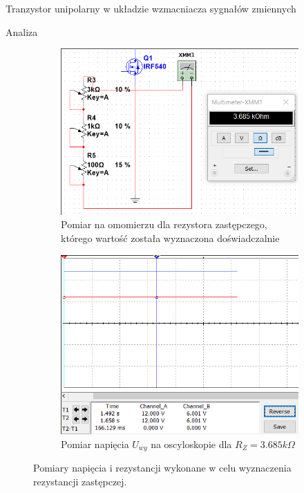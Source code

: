 \documentclass[a4paper]{scrartcl}
\begin{document}
\begin{section}{Tranzystor unipolarny w układzie wzmacniacza sygnałów zmiennych}
\begin{subsection}{Analiza}
\begin{figure}[!ht]
				\end{figure}
				\begin{figure}[!ht]
				\begin{center}
					\begin{subfigure}{.45\textwidth}
						\begin{center}
						\includegraphics[width=\linewidth,scale=2]{exercise-2-ohms}
						\caption{Pomiar na omomierzu dla rezystora zastępczego, którego wartość została wyznaczona doświadczalnie}
						\label{fig:exercise-2-punkt-pracy}
						\end{center}
					\end{subfigure}
					\begin{subfigure}{.45\textwidth}
						\begin{center}
						\includegraphics[width=\linewidth,scale=2]{exercise-2-punkt-pracy}
						\caption{Pomiar napięcia $U_{wy}$ na oscyloskopie dla $ R_{Z} = 3.685k\Omega $}
						\label{fig:exercise-2-punkt-pracy}
						\end{center}
					\end{subfigure}
				\end{center}
				\caption{Pomiary napięcia i rezystancji wykonane w celu wyznaczenia rezystancji zastępczej.}
				\end{figure}


\end{subsection}
\end{section}
\end{document}
